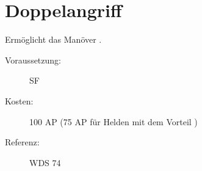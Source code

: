 \section{Doppelangriff}
\label{sf.doppelangriff}
Ermöglicht das Manöver .
\begin{description}
    \item[Voraussetzung:]
        SF 
    \item [Kosten:]
        100 AP (75 AP für Helden mit dem Vorteil )
    \item [Referenz:]
        WDS 74
\end{description}
